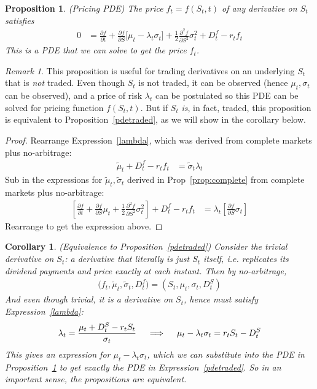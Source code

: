 \documentclass[12pt]{article}
\theoremstyle{plain}
\newtheorem{prop}[thm]{Proposition}
\newtheorem{cor}[thm]{Corollary}
\theoremstyle{definition}
\theoremstyle{remark}
\newtheorem*{rmk}{Remark}
\begin{document}
\begin{prop}\emph{(Pricing PDE)}
\label{pdenontraded}
The price $f_{t}=f(S_t,t)$ of any derivative on $S_t$ satisfies
\begin{align*}
  0
  &=
  \frac{\partial f}{\partial t}
  +
  \frac{\partial f}{\partial S}
  \big[
  \mu_t
  -
  \lambda_t
  \sigma_t
  \big]
  +
  \frac{1}{2}
  \frac{\partial^2 f}{\partial S^2}
  \sigma_t^2
  + D_t^f - r_tf_t
\end{align*}
This is a PDE that we can solve to get the price $f_{t}$.
\end{prop}
\begin{rmk}
This proposition is useful for trading derivatives on an underlying
$S_t$ that is \emph{not} traded. Even though $S_t$ is not traded, it can
be observed (hence $\mu_t,\sigma_t$ can be observed), and a price of
risk $\lambda_t$ can be postulated so this PDE can be solved for pricing
function $f(S_t,t)$.
But if $S_t$ \emph{is}, in fact, traded, this proposition is equivalent
to Proposition~\ref{pdetraded}, as we will show in the corollary below.
\end{rmk}
\begin{proof}
Rearrange Expression~\ref{lambda}, which was derived from complete
markets plus no-arbitrage:
\begin{align*}
  \tilde{\mu}_t + D_t^f - r_tf_t
  &=
  \tilde{\sigma}_t\lambda_t
\end{align*}
Sub in the expressions for $\tilde{\mu}_t,\tilde{\sigma}_t$
derived in Prop~\ref{prop:complete} from complete markets plus
no-arbitrage:
\begin{align*}
  \left[
  \frac{\partial f}{\partial t}
  +
  \frac{\partial f}{\partial S}
  \mu_t
  +
  \frac{1}{2}
  \frac{\partial^2 f}{\partial S^2}
  \sigma_t^2
  \right]
  + D_t^f - r_tf_t
  &=
  \lambda_t
  \left[
  \frac{\partial f}{\partial S}
  \sigma_t
  \right]
\end{align*}
Rearrange to get the expression above.
\end{proof}

\begin{cor}\emph{(Equivalence to Proposition~\ref{pdetraded})}
Consider the trivial derivative on $S_t$: a derivative that literally is
just $S_t$ itself, i.e. replicates its dividend payments and price
exactly at each instant. Then by no-arbitrage,
\begin{align*}
  \big(f_t,\tilde{\mu}_t,\tilde{\sigma}_t,D_t^f\big)
  =(S_t,{\mu}_t,{\sigma}_t,D_t^S)
\end{align*}
And even though trivial, it is a derivative on $S_t$, hence must satisfy
Expression~\ref{lambda}:
\begin{align*}
  \lambda_t
  =
  \frac{%
    \mu_{t}+D_{t}^S
    -
    r_tS_{t}
  }{\sigma_{t}}
  \quad\implies\quad
  \mu_{t}
  -
  \lambda_t\sigma_{t}
  =
  r_tS_{t}
  -
  D_{t}^S
\end{align*}
This gives an expression for $\mu_t-\lambda_t\sigma_t$, which we can
substitute into the PDE in Proposition~\ref{pdenontraded} to get
\emph{exactly} the PDE in Expression~\ref{pdetraded}.
So in an important sense, the propositions are equivalent.
\end{cor}
\end{document}
